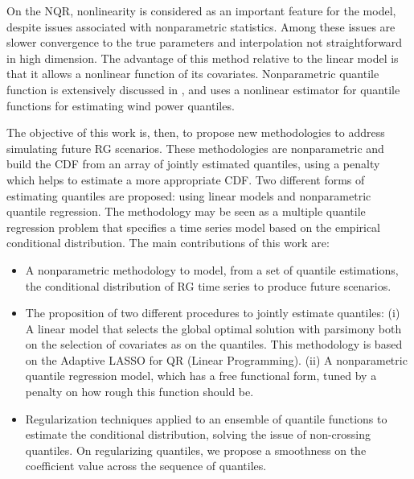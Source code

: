 On the NQR, nonlinearity is considered as an important feature for the model, despite issues associated with nonparametric statistics. Among these issues are slower convergence to the true parameters and  interpolation not straightforward in high dimension. The advantage of this method relative to the linear model is that it allows a nonlinear function of its covariates.  Nonparametric quantile function is extensively discussed in \cite{takeuchi_nonparametric_2006}, and \cite{gallego2016line} uses a nonlinear estimator for quantile functions for estimating wind power quantiles. 






 
The objective of this work is, then, to propose new methodologies to address simulating future RG scenarios. These methodologies are nonparametric and build the CDF from an array of jointly estimated quantiles, using a penalty which helps to estimate a more appropriate CDF. Two different forms of estimating quantiles are proposed: using linear models and nonparametric quantile regression. The methodology may be seen as a multiple quantile regression problem that specifies a time series model based on the empirical conditional distribution. The main contributions of this work are:
\begin{itemize}
	\item A nonparametric methodology to model, from a set of quantile estimations, the conditional distribution of RG time series to produce future scenarios.
	
	\item The proposition of two different procedures to jointly estimate quantiles: (i) A linear model that selects the global optimal solution with parsimony both on the selection of covariates as on the quantiles. This methodology is based on the Adaptive LASSO for QR (Linear Programming). (ii) A nonparametric quantile regression model, which has a free functional form, tuned by a penalty on how rough this function should be. 
	
	\item Regularization techniques applied to an ensemble of quantile functions to estimate the conditional distribution, solving the issue of non-crossing quantiles. On regularizing quantiles, we propose a smoothness on the coefficient value across the sequence of quantiles.
	
\end{itemize}

